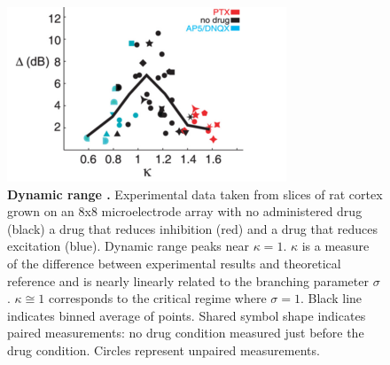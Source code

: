 \documentclass[12pt]{article}
\begin{document}
\begin{figure}      
  \begin{center}    
 \includegraphics[width=.6\textwidth]{dynamicrangeexpplenz}    
    \caption{\textbf{Dynamic range \cite{Shew2009b}.} Experimental data taken from slices of rat cortex grown on an 8x8 microelectrode array with no administered drug (black) a drug that reduces inhibition (red) and a drug that reduces excitation (blue). Dynamic range peaks near $\kappa = 1$. $\kappa$ is a measure of the difference between experimental results and theoretical reference and is nearly linearly related to the branching parameter $\sigma$. $\kappa \cong 1$ corresponds to the critical regime where $\sigma = 1$. Black line indicates binned average of points. Shared symbol shape indicates paired measurements: no drug condition measured just before the drug condition. Circles represent unpaired measurements.}
    
   \label{Figure::Dynamic Range Experiment}   
  \end{center}     
   \end{figure}
  
\end{document}
